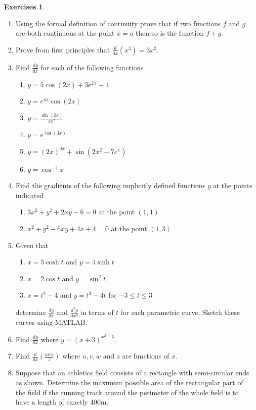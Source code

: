 \documentclass[extrafontsizes, twoside, a4paper]{memoir}
\theoremstyle{plain}%
\theoremstyle{definition}
\newtheorem{exer}{Exercises}[chapter]
\theoremstyle{remark}
\begin{document}
\begin{exer}
\begin{enumerate}
\begin{enumerate}
\item
$$\lim_{x \to \infty} \frac{3x^3 - 6x}{3x+2x^3}$$
\item
$$\lim_{x \to 0} \frac{5x-6}{2x^3}$$
\item
$$\lim_{x \to 0} (1+x)^{\frac{1}{x}}$$
\end{enumerate}
\item
Using the formal definition of continuity prove that if two functions $f$ and $g$ are both continuous at the point $x=a$ then so is the function $f+g$.
\item
Prove from first principles that $\frac{d}{dx} (x^3) = 3x^2$.
\item
Find $\frac{dy}{dx}$ for each of the following functions
\begin{enumerate}
\item
$y=5\cos{(2x)} + 3e^{2x} - 1$
\item
$y= e^{4x} \cos{(2x)}$
\item
$y= \frac{\sin{(2x)}}{x e^x}$
\item
$y= e^{\cos{(3x)}} $
\item
$y=(2x)^{3x} + \sin{(2x^2 - 7e^x)}$
\item
$y=\cos^{-1}{x}$
\end{enumerate}
\item
Find the gradients of the following implicitly defined functions $y$ at the points indicated
\begin{enumerate}
\item
$3x^2 + y^2 + 2xy - 6=0$ at the point $(1,1)$
\item
$x^2 + y^2 - 6xy +4x + 4 =0$ at the point $(1,3)$
\end{enumerate}
\item
Given that
\begin{enumerate}
\item
$x=5 \cosh{t}$ and $y=4 \sinh{t}$
\item
$x=2 \cos{t}$ and $y=\sin^2{t}$
\item
$x=t^2-4$ and $y=t^3 - 4t $ for $-3 \leq t \leq 3$
\end{enumerate}
determine $\frac{dy}{dx}$ and $\frac{d^2y}{dx^2}$ in terms of $t$ for each parametric curve. Sketch these curves using MATLAB.
\item
Find $\frac{dy}{dx}$ where $y=(x+3)^{x^2 - 3}$.
\item
Find $\frac{d}{dx} (\frac{uvw}{z})$ where $u,v,w$ and $z$ are functions of $x$.
\item
Suppose that an athletics field consists of a rectangle with semi-circular ends as shown. Determine the maximum possible area of the rectangular part of the field if the running track around the perimeter of the whole field is to have a length of exactly 400m.

\end{enumerate}
\end{exer}
\end{document}
